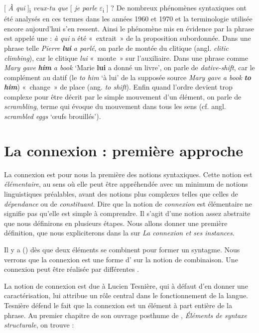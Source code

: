 {    \ea{}
        [ \textit{À qui} ]{\textsubscript{i}} \textit{veux-tu que} [ \textit{je parle} $\varepsilon ${\textsubscript{i}} ] ?
    \z
    De nombreux phénomènes syntaxiques ont été analysés en ces termes dans les années 1960 et 1970 et la terminologie utilisée encore aujourd’hui s’en ressent. Ainsi le phénomène mis en évidence par la phrase  est appelé une : \textit{à qui} a été «~extrait~» de la proposition subordonnée. Dans une phrase telle \textit{Pierre} \textbf{\textit{lui}} \textit{a parlé}, on parle de montée du clitique (angl. \textit{clitic climbing}), car le clitique \textit{lui} «~monte~» sur l’auxiliaire. Dans une phrase comme \textit{Mary gave} \textbf{\textit{him}} \textit{a book} ‘Marie \textbf{lui} a donné un livre’, on parle de \textit{dative-shift}, car le complément au datif (le \textit{to him} ‘à lui’ de la supposée source \textit{Mary gave a book} \textbf{\textit{to him}}) «~change~» de place (ang. \textit{to shift}). Enfin quand l’ordre devient trop complexe pour être décrit par le simple mouvement d’un élément, on parle de \textit{scrambling}, terme qui évoque du mouvement dans tous les sens (cf. angl. \textit{scrambled eggs} ‘œufs brouillés’).
}
\section{La connexion : première approche}\label{sec:3.2.8}\largerpage

La connexion est pour nous la première des notions syntaxiques. Cette notion est \textit{élémentaire}, au sens où elle peut être appréhendée avec un minimum de notions linguistiques préalables, avant des notions plus complexes telles que celles de \textit{dépendance} ou de \textit{constituant}. Dire que la notion de \textit{connexion} est élémentaire ne signifie pas qu'elle est simple à comprendre. Il s'agit d'une notion assez abstraite que nous définirons en plusieurs étapes.
Nous allons donner une première définition, que nous expliciterons dans la  sur \textit{La connexion et ses instances}.

{Il y a  () dès que deux éléments se combinent pour former un syntagme. Nous verrons que la connexion est une forme d’ sur la notion de combinaison. Une connexion peut être réalisée par différentes .}

La notion de connexion est due à Lucien Tesnière, qui à défaut d’en donner une caractérisation, lui attribue un rôle central dans le fonctionnement de la langue. Tesnière défend le fait que la connexion est un élément à part entière de la phrase. Au premier chapitre de son ouvrage posthume de \citeyear{tesniere1959elements}, \textit{Éléments de syntaxe structurale}, on trouve :


